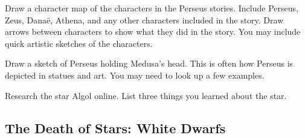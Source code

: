 \documentclass{article}
\numberwithin{equation}{section}
\numberwithin{figure}{section}
\begin{document}
\begin{exercise}
    Draw a character map of the characters in the Perseus stories. Include Perseus, Zeus, Dana\"{e}, Athena, and any other characters included in the story. Draw arrows between characters to show what they did in the story. You may include quick artistic sketches of the characters.
\end{exercise}

\begin{exercise}
    Draw a sketch of Perseus holding Medusa's head. This is often how Perseus is depicted in statues and art. You may need to look up a few examples.
\end{exercise}

\begin{exercise} \label{WOot0c}
    Research the star Algol online. List three things you learned about the star. 
\end{exercise}

\clearpage

\subsection{The Death of Stars: White Dwarfs} \label{yqCTwS}
\end{document}
